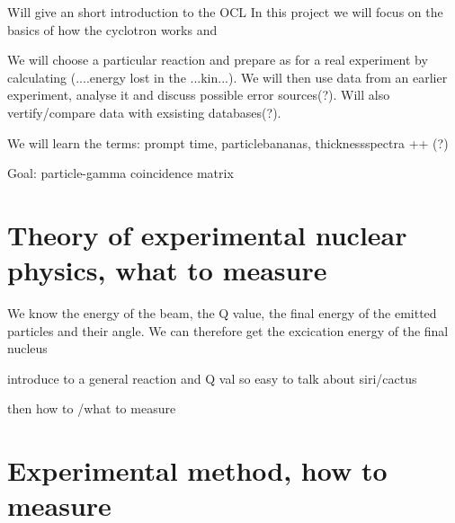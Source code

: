 \documentclass[11pt,a4wide]{article}
\begin{document}
Will give an short introduction to the OCL
In this project we will focus on the basics of how the cyclotron works and 



We will choose a particular reaction and prepare as for a real experiment by calculating (....energy lost in the ...kin...). We will then use data from an earlier experiment, analyse it and discuss possible error sources(?). Will also vertify/compare data with exsisting databases(?).

We will learn the terms: prompt time, particlebananas, thicknessspectra ++ (?)

Goal: particle-gamma coincidence matrix

\section{Theory of experimental nuclear physics, what to measure}

We know the energy of the beam, the Q value, the final energy of the emitted particles and their angle. We can therefore get the excication energy of the final nucleus

introduce to a general reaction and Q val so easy to talk about siri/cactus

then how to /what to measure

\section{Experimental method, how to measure}
\end{document}
